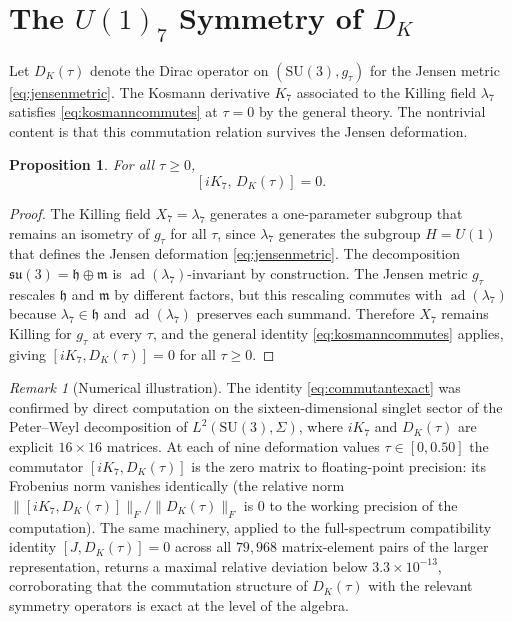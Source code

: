\documentclass[12pt]{article}
\newtheorem{proposition}[theorem]{Proposition}
\theoremstyle{definition}
\theoremstyle{remark}
\newtheorem{remark}[theorem]{Remark}
\newcommand{\ad}{\operatorname{ad}}
\begin{document}
\section{The \texorpdfstring{$U(1)_7$}{U(1)\_7} Symmetry of \texorpdfstring{$D_K$}{D\_K}}
\label{sec:U1symmetry}

Let $D_K(\tau)$ denote the Dirac operator on $(\mathrm{SU}(3), g_\tau)$ for the Jensen metric \eqref{eq:jensenmetric}.  The Kosmann derivative $K_7$ associated to the Killing field $\lambda_7$ satisfies \eqref{eq:kosmanncommutes} at $\tau = 0$ by the general theory.  The nontrivial content is that this commutation relation survives the Jensen deformation.

\begin{proposition}\label{prop:commutant}
For all $\tau \geq 0$,
\begin{equation}\label{eq:commutantexact}
  [iK_7, \, D_K(\tau)] = 0.
\end{equation}
\end{proposition}

\begin{proof}
The Killing field $X_7 = \lambda_7$ generates a one-parameter subgroup that remains an isometry of $g_\tau$ for all $\tau$, since $\lambda_7$ generates the subgroup $H = U(1)$ that defines the Jensen deformation \eqref{eq:jensenmetric}.  The decomposition $\mathfrak{su}(3) = \mathfrak{h} \oplus \mathfrak{m}$ is $\ad(\lambda_7)$-invariant by construction.  The Jensen metric $g_\tau$ rescales $\mathfrak{h}$ and $\mathfrak{m}$ by different factors, but this rescaling commutes with $\ad(\lambda_7)$ because $\lambda_7 \in \mathfrak{h}$ and $\ad(\lambda_7)$ preserves each summand.  Therefore $X_7$ remains Killing for $g_\tau$ at every $\tau$, and the general identity \eqref{eq:kosmanncommutes} applies, giving $[iK_7, D_K(\tau)] = 0$ for all $\tau \geq 0$.
\end{proof}

\begin{remark}[Numerical illustration]\label{rem:numillustration}
The identity \eqref{eq:commutantexact} was confirmed by direct computation on the sixteen-dimensional singlet sector of the Peter--Weyl decomposition of $L^2(\mathrm{SU}(3), \Sigma)$, where $iK_7$ and $D_K(\tau)$ are explicit $16 \times 16$ matrices.  At each of nine deformation values $\tau \in [0, 0.50]$ the commutator $[iK_7, D_K(\tau)]$ is the zero matrix to floating-point precision: its Frobenius norm vanishes identically (the relative norm $\|[iK_7, D_K(\tau)]\|_F / \|D_K(\tau)\|_F$ is $0$ to the working precision of the computation).  The same machinery, applied to the full-spectrum compatibility identity $[J, D_K(\tau)] = 0$ across all $79{,}968$ matrix-element pairs of the larger representation, returns a maximal relative deviation below $3.3 \times 10^{-13}$, corroborating that the commutation structure of $D_K(\tau)$ with the relevant symmetry operators is exact at the level of the algebra.
\end{remark}
\end{document}
